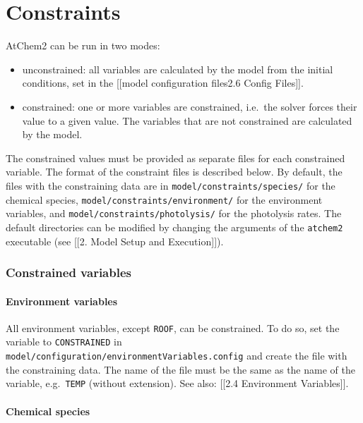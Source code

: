 \chapter{Constraints}

AtChem2 can be run in two modes:

\begin{itemize}
\tightlist
\item
  unconstrained: all variables are calculated by the model from the
  initial conditions, set in the {[}{[}model configuration
  files\textbar{}2.6 Config Files{]}{]}.
\item
  constrained: one or more variables are constrained, i.e.~the solver
  forces their value to a given value. The variables that are not
  constrained are calculated by the model.
\end{itemize}

The constrained values must be provided as separate files for each
constrained variable. The format of the constraint files is described
below. By default, the files with the constraining data are in
\texttt{model/constraints/species/} for the chemical species,
\texttt{model/constraints/environment/} for the environment variables,
and \texttt{model/constraints/photolysis/} for the photolysis rates. The
default directories can be modified by changing the arguments of the
\texttt{atchem2} executable (see {[}{[}2. Model Setup and
Execution{]}{]}).

\hypertarget{constrained-variables}{%
\subsection{Constrained variables}\label{constrained-variables}}

\hypertarget{environment-variables}{%
\subsubsection{Environment variables}\label{environment-variables}}

All environment variables, except \texttt{ROOF}, can be constrained. To
do so, set the variable to \texttt{CONSTRAINED} in
\texttt{model/configuration/environmentVariables.config} and create the
file with the constraining data. The name of the file must be the same
as the name of the variable, e.g.~\texttt{TEMP} (without extension). See
also: {[}{[}2.4 Environment Variables{]}{]}.

\hypertarget{chemical-species}{%
\subsubsection{Chemical species}\label{chemical-species}}

